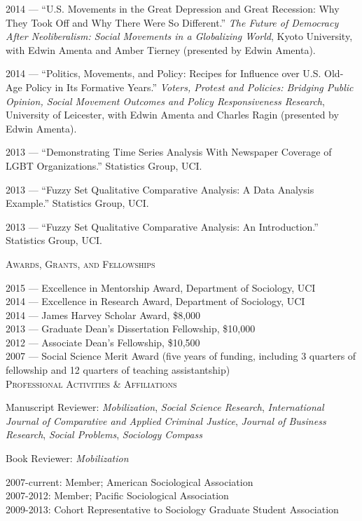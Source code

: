 \documentclass[11pt]{article}
\newcommand{\sectionheader}[1]{
{\Large
\textsc{#1}}
}
\begin{document}
2014 --- ``U.S. Movements in the Great Depression and Great Recession: Why They Took Off and Why There Were So Different.'' \textit{The Future of Democracy After Neoliberalism: Social Movements in a Globalizing World}, Kyoto University, with Edwin Amenta and Amber Tierney (presented by Edwin Amenta). 

2014 --- ``Politics, Movements, and Policy: Recipes for Influence over U.S. Old-Age Policy in Its Formative Years.'' \textit{Voters, Protest and Policies: Bridging Public Opinion, Social Movement Outcomes and Policy Responsiveness Research}, University of Leicester, with Edwin Amenta and Charles Ragin (presented by Edwin Amenta).

2013 --- ``Demonstrating Time Series Analysis With Newspaper Coverage of LGBT Organizations.'' Statistics Group, UCI.

2013 --- ``Fuzzy Set Qualitative Comparative Analysis: A Data Analysis Example.'' Statistics Group, UCI.

2013 --- ``Fuzzy Set Qualitative Comparative Analysis: An Introduction.'' Statistics Group, UCI.



\sectionheader{Awards, Grants, and Fellowships}

2015 --- Excellence in Mentorship Award, Department of Sociology, UCI\\
2014 --- Excellence in Research Award, Department of Sociology, UCI\\
2014 --- James Harvey Scholar Award, \$8,000\\
2013 --- Graduate Dean's Dissertation Fellowship, \$10,000\\
2012 --- Associate Dean's Fellowship, \$10,500\\
2007 --- Social Science Merit Award (five years of funding, including 3 quarters of fellowship and 12 quarters of teaching assistantship)\\


\sectionheader{Professional Activities \& Affiliations}

Manuscript Reviewer: \textit{Mobilization}, \textit{Social Science Research}, \textit{International Journal of Comparative and Applied Criminal Justice}, \textit{Journal of Business Research}, \textit{Social Problems}, \textit{Sociology Compass}

Book Reviewer: \textit{Mobilization}

2007-current:	Member; American Sociological Association\\
2007-2012:	Member; Pacific Sociological Association\\
2009-2013:	Cohort Representative to Sociology Graduate Student Association
\end{document}
